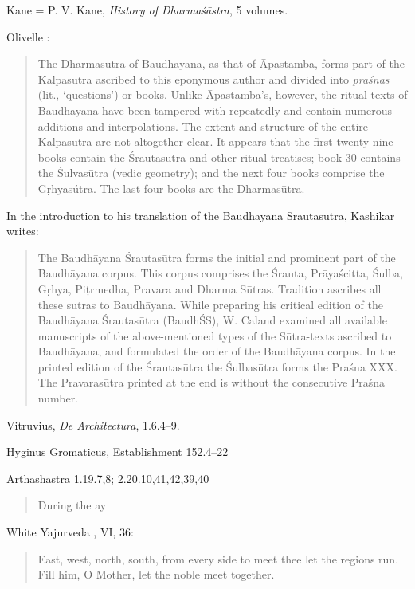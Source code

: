 \documentclass{article}
\begin{document}
Kane = P. V. Kane, {\em History of Dharma\'s\=astra}, 5 volumes. 

Olivelle \cite[p.~127]{olivelle}:

\begin{quote}
The Dharmas\=utra of Baudh\=ayana, as that of \=Apastamba,
forms part of the Kalpas\=utra ascribed to this eponymous author
and divided into {\em pra\'snas} (lit., `questions') or books. Unlike
\=Apastamba's, however, the ritual texts of Baudh\=ayana have been
tampered with repeatedly and contain numerous additions and
interpolations. The extent and structure of the entire Kalpas\=utra
are not altogether clear. It appears that the first twenty-nine
books contain the \'Srautas\=utra and other ritual treatises; book
30 contains the \'Sulvas\=utra (vedic geometry); and the next four
books comprise the G\d{r}hyas\'utra. The last four books are the
Dharmas\=utra. 
\end{quote}

In the introduction to his translation of the Baudhayana Srautasutra, Kashikar \cite[p.~xi]{kashikarI} writes:

\begin{quote}
The Baudh\=ayana \'Srautas\=utra forms the initial and prominent part of
the Baudh\=ayana corpus. This corpus comprises the \'Srauta, Pr\=aya\'scitta,
\'Sulba, G\d{r}hya, Pi\d{t}rmedha, Pravara and Dharma S\=utras. Tradition ascribes all
these sutras to Baudh\=ayana. While preparing his critical edition of the
Baudh\=ayana \'Srautas\=utra (Baudh\'SS), W. Caland examined all available
manuscripts of the above-mentioned types of the S\=utra-texts ascribed to
Baudh\=ayana, and formulated the order of the Baudh\=ayana corpus. In the 
printed edition of the \'Srautas\=utra the \'Sulbas\=utra forms the Pra\'sna XXX.
The Pravaras\=utra printed at the end is without the consecutive Pra\'sna 
number.
\end{quote}

Vitruvius, {\em De Architectura}, 1.6.4--9.

Hyginus Gromaticus, Establishment 152.4--22

Arthashastra 1.19.7,8; 2.20.10,41,42,39,40

\begin{quote}
During the ay
\end{quote}

White Yajurveda \cite[p.~50]{white}, VI, 36:

\begin{quote}
East, west, north, south, from every side to meet thee let the regions run.\\
Fill him, O Mother, let the noble meet together.
\end{quote}
\end{document}
